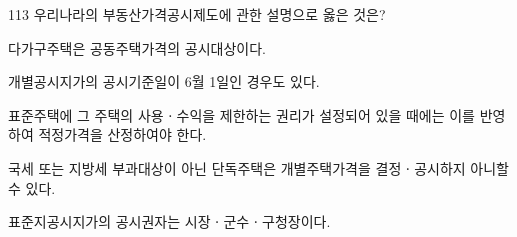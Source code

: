 \begin{question}{113}
우리나라의 부동산가격공시제도에 관한 설명으로 옳은 것은?
\begin{choices}
  \item 다가구주택은 공동주택가격의 공시대상이다.
  \item 개별공시지가의 공시기준일이 6월 1일인 경우도 있다.
  \item 표준주택에 그 주택의 사용ㆍ수익을 제한하는 권리가 설정되어 있을 때에는 이를 반영하여 적정가격을 산정하여야 한다.
  \item 국세 또는 지방세 부과대상이 아닌 단독주택은 개별주택가격을 결정ㆍ공시하지 아니할 수 있다.
  \item 표준지공시지가의 공시권자는 시장ㆍ군수ㆍ구청장이다.
\end{choices}
\end{question}
